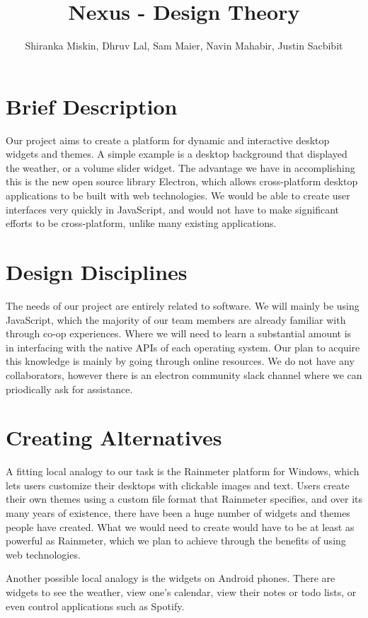 \documentclass[11pt, oneside]{article}   	%
\title{Nexus - Design Theory}
\author{Shiranka Miskin, Dhruv Lal, Sam Maier, Navin Mahabir, Justin Sacbibit}
\begin{document}
\maketitle
\section {Brief Description}
Our project aims to create a platform for dynamic and interactive desktop
widgets and themes.  A simple example is a desktop background that displayed the
weather, or a volume slider widget.  The advantage we have in accomplishing this
is the new open source library Electron, which allows cross-platform desktop
applications to be built with web technologies.  We would be able to create user
interfaces very quickly in JavaScript, and would not have to make significant
efforts to be cross-platform, unlike many existing applications.

\section{Design Disciplines}
The needs of our project are entirely related to software.  We will mainly be
using JavaScript, which the majority of our team members are already familiar with
through co-op experiences.  Where we will need to learn a substantial amount is
in interfacing with the native APIs of each operating system.  Our plan to
acquire this knowledge is mainly by going through online resources.  We do not
have any collaborators, however there is an electron community slack channel
where we can priodically ask for assistance.

\section{Creating Alternatives}
A fitting local analogy to our task is the Rainmeter platform for Windows, which
lets users customize their desktops with clickable images and text.  Users
create their own themes using a custom file format that Rainmeter specifies, and
over its many years of existence, there have been a huge number of widgets and
themes people have created.  What we would need to create would have to be at
least as powerful as Rainmeter, which we plan to achieve through the benefits of
using web technologies.

Another possible local analogy is the widgets on Android phones.  There are
widgets to see the weather, view one's calendar, view their notes or todo lists,
or even control applications such as Spotify.
\end{document}
